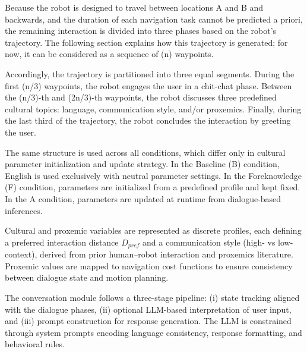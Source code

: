 Because the robot is designed to travel  between locations A and B and backwards, and the duration of each navigation task cannot be predicted a priori, the remaining interaction is divided into three phases based on the robot's trajectory. The following section explains how this trajectory is generated; for now, it can be considered as a sequence of (n) waypoints.

Accordingly, the trajectory is partitioned into three equal segments. During the first (n/3) waypoints, the robot engages the user in a chit-chat phase. Between the (n/3)-th and (2n/3)-th waypoints, the robot discusses three predefined cultural topics: language, communication style, and/or proxemics. Finally, during the last third of the trajectory, the robot concludes the interaction by greeting the user.


The same structure is used across all conditions, which differ only in cultural parameter initialization and update strategy. In the Baseline (B) condition, English is used exclusively with neutral parameter settings. In the Foreknowledge (F) condition, parameters are initialized from a predefined profile and kept fixed. In the A condition, parameters are updated at runtime from dialogue-based inferences.

Cultural and proxemic variables are represented as discrete profiles, each defining a preferred interaction distance $D_{pref}$ and a communication style (high- vs low-context), derived from prior human--robot interaction and proxemics literature. Proxemic values are mapped to navigation cost functions to ensure consistency between dialogue state and motion planning.

The conversation module follows a three-stage pipeline: (i) state tracking aligned with the dialogue phases, (ii) optional LLM-based interpretation of user input, and (iii) prompt construction for response generation. The LLM is constrained through system prompts encoding language consistency, response formatting, and behavioral rules.

